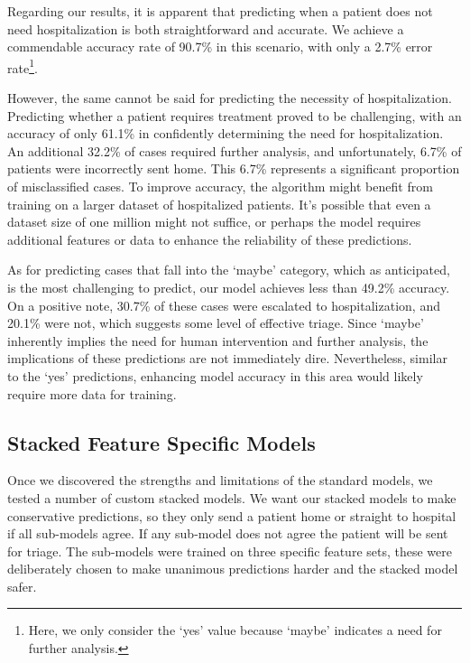 Regarding our results, it is apparent that predicting when a patient does not need 
hospitalization is both straightforward and accurate. We achieve a commendable 
accuracy rate of 90.7\% in this scenario, with only a 2.7\% error rate\footnote{Here, we only consider the `yes' value because `maybe' indicates a need for further analysis.}.

However, the same cannot be said for predicting the necessity of hospitalization.
Predicting whether a patient requires treatment proved to be challenging, with an
accuracy of only 61.1\% in confidently determining the need for hospitalization.
An additional 32.2\% of cases required further analysis, and unfortunately, 6.7\% of 
patients were incorrectly sent home. This 6.7\% represents a significant proportion 
of misclassified cases. To improve accuracy, the algorithm might benefit from 
training on a larger dataset of hospitalized patients. It's possible that even a 
dataset size of one million might not suffice, or perhaps the model requires 
additional features or data to enhance the reliability of these predictions.

As for predicting cases that fall into the `maybe' category, which as anticipated,
is the most challenging to predict, our model achieves less than 49.2\% accuracy.
On a positive note, 30.7\% of these cases were escalated to hospitalization, 
and 20.1\% were not, which suggests some level of effective triage. Since `maybe'
inherently implies the need for human intervention and further analysis, the 
implications of these predictions are not immediately dire. Nevertheless, similar 
to the `yes' predictions, enhancing model accuracy in this area would likely 
require more data for training.

\subsection{Stacked Feature Specific Models}
\label{subsec:stack}

Once we discovered the strengths and limitations of the standard models, we tested a 
number of custom stacked models. We want our stacked models to make conservative 
predictions, so they only send a patient home or straight to hospital if all sub-models 
agree. If any sub-model does not agree the patient will be sent for triage. The 
sub-models were trained on three specific feature sets, these were deliberately
chosen to make unanimous predictions harder and the stacked model safer.

